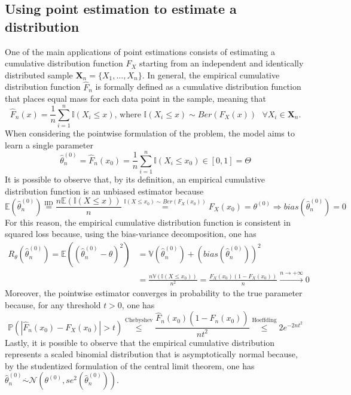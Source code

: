 \documentclass{report}
\begin{document}
\subsection{Using point estimation to estimate a distribution}
One of the main applications of point estimations consists of estimating a cumulative distribution function $\displaystyle F_X$ starting from an independent and identically distributed sample $\displaystyle \mathbf{X}_n = \{X_1, \dots, X_n\}$. \newline
In general, the empirical cumulative distribution function $\displaystyle \hat{F}_n$ is formally defined as a cumulative distribution function that places equal mass for each data point in the sample, meaning that
\[\hat{F}_n(x) = \frac{1}{n}\sum_{i = 1}^n \mathbb{I}(X_i \leq x) \text{, where $\mathbb{I}(X_i \leq x) \sim Ber(F_X(x)) \text{ } \forall X_i \in \mathbf{X}_n$.}\]
When considering the pointwise formulation of the problem, the model aims to learn a single parameter
\[\hat{\theta}_n^{(0)} = \hat{F}_n(x_0) = \frac{1}{n}\sum_{i = 1}^n \mathbb{I}(X_i \leq x_0) \in [0, 1] = \Theta\]
It is possible to observe that, by its definition, an empirical cumulative distribution function is an unbiased estimator because
\[\mathbb{E}(\hat{\theta}_n^{(0)}) \stackrel{\text{IID}}{=} \frac{n\mathbb{E}(\mathbb{I}(X \leq x))}{n} \stackrel{\mathbb{I}(X \leq x_0) \sim Ber(F_X(x_0))}{=} F_X(x_0) = \theta^{(0)} \Rightarrow bias(\hat{\theta}_n^{(0)}) = 0\]
For this reason, the empirical cumulative distribution function is consistent in squared loss because, using the bias-variance decomposition, one has
\begin{align*}
    R_{\theta}(\hat{\theta}_n^{(0)}) = \mathbb{E}((\hat{\theta}_n^{(0)} - \theta)^2)
        &= \mathbb{V}(\hat{\theta}_n^{(0)}) + (bias(\hat{\theta}_n^{(0)}))^2 \\
        &= \frac{n\mathbb{V}(\mathbb{I}(X \leq x_0))}{n^2} = \frac{F_X(x_0)(1 - F_X(x_0))}{n} \xrightarrow{n \to +\infty} 0
\end{align*}
Moreover, the pointwise estimator converges in probability to the true parameter because, for any threshold $\displaystyle t > 0$, one has
\[\mathbb{P}(|\hat{F}_n(x_0) - F_X(x_0)| > t) \stackrel{\text{Chebyshev}}{\leq} \frac{\hat{F}_n(x_0)(1 - \hat{F}_n(x_0))}{nt^2} \stackrel{\text{Hoeffding}}{\leq} 2e^{-2nt^2}\]
Lastly, it is possible to observe that the empirical cumulative distribution represents a scaled binomial distribution that is asymptotically normal because, by the studentized formulation of the central limit theorem, one has $\displaystyle \hat{\theta}_n^{(0)} \stackrel{.}{\sim} \mathcal{N}(\theta^{(0)}, se^2(\hat{\theta}_n^{(0)}))$. \newline
\end{document}
